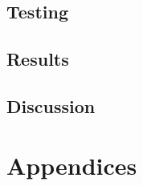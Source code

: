 \documentclass{report}
\begin{document}
\chapter{Testing}
	

\chapter{Results}
	

\chapter{Discussion}
	

\printindex
\printglossaries

\part{Appendices}
	



\nocite{*}
\end{document}
